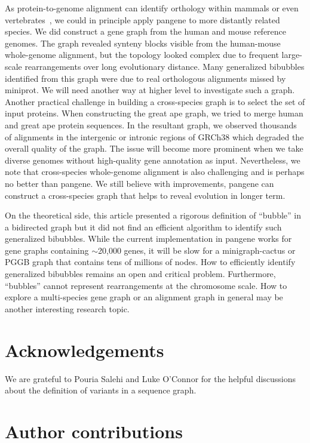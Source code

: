 \documentclass[webpdf,contemporary,large,namedate]{oup-authoring-template}%
\begin{document}
As protein-to-genome alignment can identify orthology within mammals or even vertebrates~\citep{Li:2023ac},
we could in principle apply pangene to more distantly related species.
We did construct a gene graph from the human and mouse reference genomes.
The graph revealed synteny blocks visible from the human-mouse whole-genome alignment,
but the topology looked complex due to frequent large-scale rearrangements over long evolutionary distance.
Many generalized bibubbles identified from this graph were due to real orthologous alignments missed by miniprot.
We will need another way at higher level to investigate such a graph.
Another practical challenge in building a cross-species graph is to select the set of input proteins.
When constructing the great ape graph, we tried to merge human and great ape protein sequences.
In the resultant graph, we observed thousands of alignments in the intergenic or intronic regions of GRCh38
which degraded the overall quality of the graph.
The issue will become more prominent when we take diverse genomes without high-quality gene annotation as input.
Nevertheless, we note that cross-species whole-genome alignment is also challenging and is perhaps no better than pangene.
We still believe with improvements, pangene can construct a cross-species graph that helps to reveal evolution in longer term.

On the theoretical side, this article presented a rigorous definition of ``bubble'' in a bidirected graph
but it did not find an efficient algorithm to identify such generalized bibubbles.
While the current implementation in pangene works for gene graphs containing $\sim$20,000 genes,
it will be slow for a minigraph-cactus or PGGB graph that contains tens of millions of nodes.
How to efficiently identify generalized bibubbles remains an open and critical problem.
Furthermore, ``bubbles'' cannot represent rearrangements at the chromosome scale.
How to explore a multi-species gene graph or an alignment graph in general
may be another interesting research topic.

\section*{Acknowledgements}

We are grateful to Pouria Salehi and Luke O'Connor for the helpful discussions about the definition of variants in a sequence graph.

\section*{Author contributions}
\end{document}
